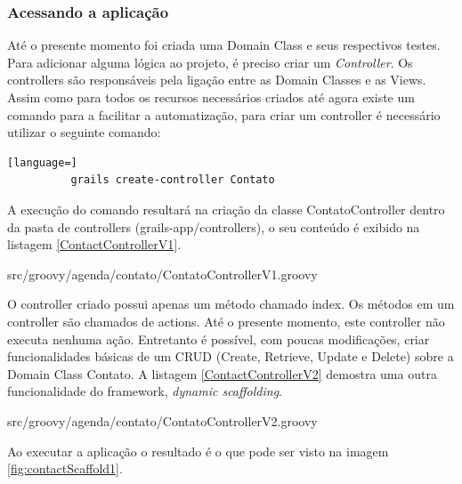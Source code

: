 \documentclass[12pt]{article}
\begin{document}
\subsubsection{Acessando a aplicação}

    Até o presente momento foi criada uma Domain Class e seus respectivos testes.
    Para adicionar alguma lógica ao projeto, é preciso criar um \emph{Controller}.
    Os controllers são responsáveis pela ligação entre as Domain Classes e as Views.
    Assim como para todos os recursos necessários criados até agora existe um comando
    para a facilitar a automatização, para criar um controller é necessário utilizar
    o seguinte comando:
    
    \begin{lstlisting}[language=]
          grails create-controller Contato
    \end{lstlisting}
    
    A execução do comando resultará na criação da classe ContatoController dentro
    da pasta de controllers (grails-app/controllers), o seu conteúdo é exibido na
    listagem \ref{ContactControllerV1}.
    
    
                   {src/groovy/agenda/contato/ContatoControllerV1.groovy}
                   
    O controller criado possui apenas um método chamado index. Os métodos em um 
    controller são chamados de actions. Até o presente momento, este controller
    não executa nenhuma ação. Entretanto é possível, com poucas modificações, criar
    funcionalidades básicas de um CRUD (Create, Retrieve, Update e Delete) sobre 
    a Domain Class Contato. A listagem \ref{ContactControllerV2} demostra uma outra
    funcionalidade do framework, \emph{dynamic scaffolding}. 
    
    
                   {src/groovy/agenda/contato/ContatoControllerV2.groovy}

    
    Ao executar a aplicação o resultado é o que pode ser visto na imagem \ref{fig:contactScaffold1}.
\end{document}
